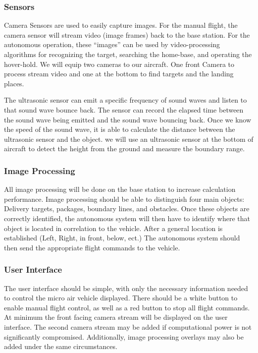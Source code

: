 \documentclass[onecolumn, draftclsnofoot,10pt, compsoc]{IEEEtran}
\begin{document}
\subsubsection{Sensors}%

Camera Sensors are used to easily capture images. For the manual flight, the camera sensor will stream video (image frames) back to the base station. For the autonomous operation, these “images” can be used by video-processing algorithms for recognizing the target, searching the home-base, and operating the hover-hold. We will equip two cameras to our aircraft. One front Camera to process stream video and one at the bottom to find targets and the landing places.


The ultrasonic sensor can emit a specific frequency of sound waves and listen to that sound wave bounce back. The sensor can record the elapsed time between the sound wave being emitted and the sound wave bouncing back. \cite{r11} Once we know the speed of the sound wave, it is able to calculate the distance between the ultrasonic sensor and the object. we will use an ultrasonic sensor at the bottom of aircraft to detect the height from the ground and measure the boundary range.


\subsubsection{Image Processing}

All image processing will be done on the base station to increase calculation performance. Image processing should be able to distinguish four main objects: Delivery targets, packages, boundary lines, and obstacles. Once these objects are correctly identified, the autonomous system will then have to identify where that object is located in correlation to the vehicle. After a general location is established (Left, Right, in front, below, ect.) The autonomous system should then send the appropriate flight commands to the vehicle. 

\subsubsection{User Interface}

The user interface should be simple, with only the necessary information needed to control the micro air vehicle displayed. There should be a white button to enable manual flight control, as well as a red button to stop all flight commands. At minimum the front facing camera stream will be displayed on the user interface. The second camera stream may be added if computational power is not significantly compromised. Additionally, image processing overlays may also be added under the same circumstances. 
\end{document}
